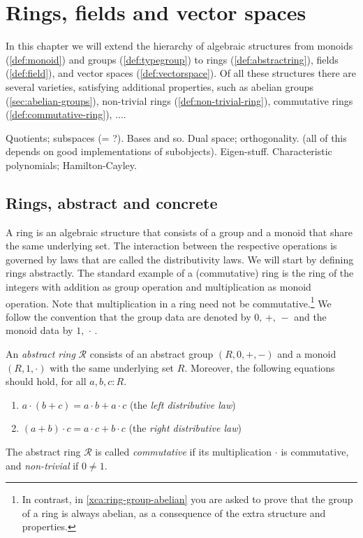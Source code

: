 \chapter{Rings, fields and vector spaces}
\label{ch:fields}

In this chapter we will extend the hierarchy of algebraic structures from 
monoids (\cref{def:monoid}) and 
groups (\cref{def:typegroup}) to
rings (\cref{def:abstractring}),
fields (\cref{def:field}), and
vector spaces (\cref{def:vectorspace}).
Of all these structures there are several varieties, 
satisfying additional properties, such as 
abelian groups (\cref{sec:abelian-groups}),
non-trivial rings (\cref{def:non-trivial-ring}),
commutative rings (\cref{def:commutative-ring}),
....

Quotients; subspaces (= ?). Bases and so. Dual space; orthogonality. (all of this depends on good implementations of subobjects). Eigen-stuff. Characteristic polynomials; Hamilton-Cayley.

\section{Rings, abstract and concrete}

A ring is an algebraic structure that consists of a group and a
monoid that share the same underlying set. The interaction between
the respective operations is governed by laws that are called
the distributivity laws. We will start by defining rings abstractly.
The standard example of a (commutative) ring is the
ring of the integers with addition as
group operation and multiplication as monoid operation.
Note that multiplication in a ring need not be commutative.\footnote{%
In contrast, in \cref{xca:ring-group-abelian} you are asked to prove
that the group of a ring is always abelian, as a consequence of the
extra structure and properties.} 
We follow the convention that the group data are denoted
by $0,\,+,\,-$ and the monoid data by $1,\,\cdot\,$.

\begin{definition}\label{def:abstractring}
An \emph{abstract ring} $\mathscr R$ consists of an abstract group 
$(R,0,+,-)$ and a monoid $(R,1,\cdot)$ with the
same underlying set $R$. Moreover, the following equations should hold,
for all $a,b,c : R$.
    \begin{enumerate}[ref=\ref{def:abstractring} (\alph*)]
    \item\label{ring:ldistr-law} $a \cdot (b + c) = a \cdot b + a \cdot c$ (the \emph{left distributive law})
    \item\label{ring:rdistr-law} $(a + b) \cdot  c = a \cdot c + b \cdot c$ (the \emph{right distributive law})
    \end{enumerate}
The abstract ring $\mathscr R$ is called \emph{commutative} if its
multiplication $\cdot$ is commutative, and \emph{non-trivial} if $0\neq 1$.
\end{definition}

